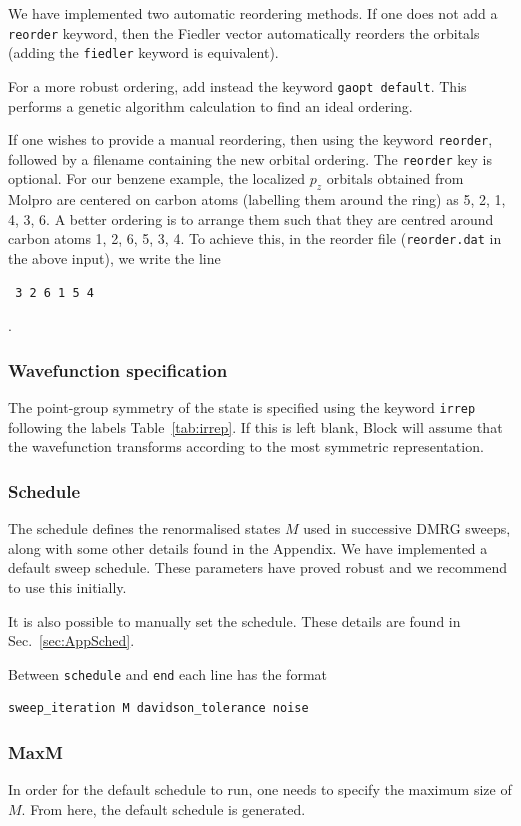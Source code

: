 \documentclass[letterpaper,12pt,aps, pra]{revtex4-1}
\begin{document}
We have implemented two automatic reordering methods. If one does not add a \texttt{reorder} keyword, then the Fiedler vector automatically reorders the orbitals (adding the \texttt{fiedler} keyword is equivalent).

For a more robust ordering, add instead the keyword \texttt{gaopt default}. This performs a genetic algorithm calculation to find an ideal ordering.

If one wishes to provide a manual reordering, then 
using the keyword \texttt{reorder}, followed by a filename containing the new
orbital ordering.  
The \texttt{reorder} key is optional. 
For our benzene example, the localized $p_z$
orbitals obtained from Molpro are centered on carbon atoms (labelling them
around the ring) as 5, 2, 1, 4, 3, 6. A better ordering  is to arrange them
such that they are centred around carbon atoms 1, 2, 6, 5, 3, 4.  To achieve
this, in the reorder file (\texttt{reorder.dat} in the above input), we write
the line 
\begin{verbatim} 3 2 6 1 5 4 \end{verbatim}. 

\subsubsection{Wavefunction specification}

The point-group symmetry of the state is specified using the keyword \texttt{irrep} following the labels Table~\ref{tab:irrep}.
If this is left blank, Block will assume that the wavefunction transforms according to the most symmetric representation.


\subsubsection{Schedule}
The schedule defines the renormalised states $M$ used in successive DMRG
sweeps, along with some other details found in the Appendix. We have
implemented a default sweep schedule. These parameters have proved robust and
we recommend to use this initially.

It is also possible to manually set the schedule. These details are found in 
Sec.~\ref{sec:AppSched}.

Between \texttt{schedule} and \texttt{end} each line
has the format
\begin{verbatim}
sweep_iteration M davidson_tolerance noise
\end{verbatim}

\subsubsection{MaxM}
In order for the default schedule to run, one needs to specify the maximum size of $M$. From here, the default schedule is generated.
\end{document}
